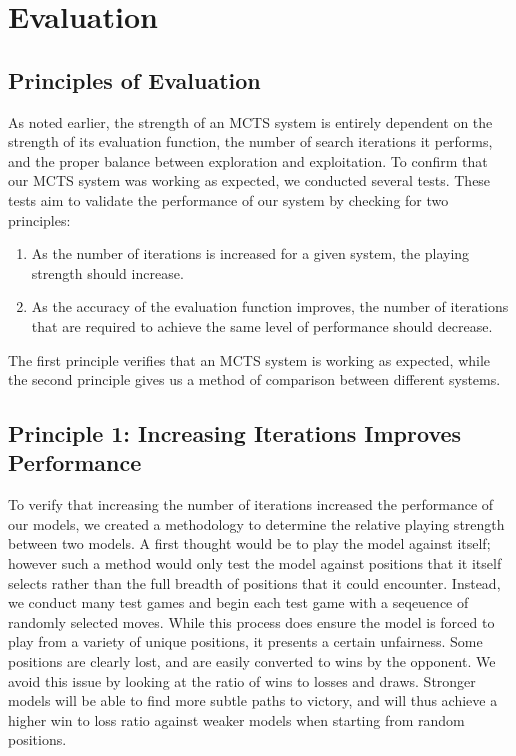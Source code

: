 \documentclass[10pt]{article}
\begin{document}
\section{Evaluation}

\subsection{Principles of Evaluation}

As noted earlier, the strength of an MCTS system is entirely dependent on the strength of its evaluation function, the number of search iterations it performs, and the proper balance between exploration and exploitation. To confirm that our MCTS system was working as expected, we conducted several tests. These tests aim to validate the performance of our system by checking for two principles:

\begin{enumerate}
    \item As the number of iterations is increased for a given system, the playing strength should increase.
    \item As the accuracy of the evaluation function improves, the number of iterations that are required to achieve the same level of performance should decrease.
\end{enumerate}

The first principle verifies that an MCTS system is working as expected, while the second principle gives us a method of comparison between different systems.

\subsection{Principle 1: Increasing Iterations Improves Performance}
\label{sec:moreitersisbetter}

To verify that increasing the number of iterations increased the performance of our models, we created a methodology to determine the relative playing strength between two models. A first thought would be to play the model against itself; however such a method would only test the model against positions that it itself selects rather than the full breadth of positions that it could encounter. Instead, we conduct many test games and begin each test game with a seqeuence of randomly selected moves. While this process does ensure the model is forced to play from a variety of unique positions, it presents a certain unfairness. Some positions are clearly lost, and are easily converted to wins by the opponent. We avoid this issue by looking at the ratio of wins to losses and draws. Stronger models will be able to find more subtle paths to victory, and will thus achieve a higher win to loss ratio against weaker models when starting from random positions.
\end{document}
